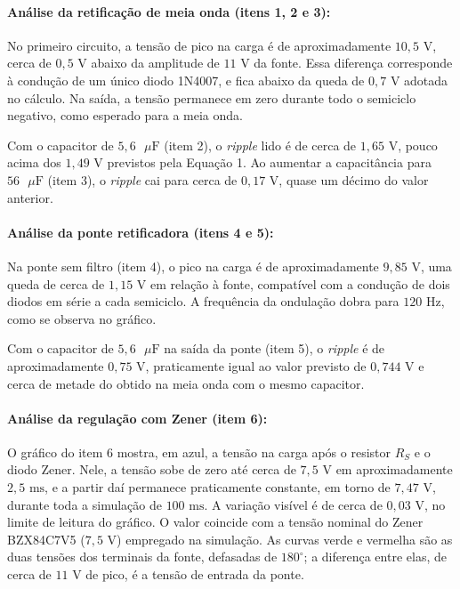 \documentclass[11pt,a4paper]{article}
\begin{document}
\paragraph{Análise da retificação de meia onda (itens 1, 2 e 3):}
No primeiro circuito, a tensão de pico na carga é de aproximadamente $10{,}5\text{ V}$, cerca de $0{,}5\text{ V}$ abaixo da amplitude de $11\text{ V}$ da fonte. Essa diferença corresponde à condução de um único diodo 1N4007, e fica abaixo da queda de $0{,}7\text{ V}$ adotada no cálculo. Na saída, a tensão permanece em zero durante todo o semiciclo negativo, como esperado para a meia onda.

Com o capacitor de $5{,}6\text{ }\mu\text{F}$ (item 2), o \textit{ripple} lido é de cerca de $1{,}65\text{ V}$, pouco acima dos $1{,}49\text{ V}$ previstos pela Equação 1. Ao aumentar a capacitância para $56\text{ }\mu\text{F}$ (item 3), o \textit{ripple} cai para cerca de $0{,}17\text{ V}$, quase um décimo do valor anterior.

\paragraph{Análise da ponte retificadora (itens 4 e 5):}
Na ponte sem filtro (item 4), o pico na carga é de aproximadamente $9{,}85\text{ V}$, uma queda de cerca de $1{,}15\text{ V}$ em relação à fonte, compatível com a condução de dois diodos em série a cada semiciclo. A frequência da ondulação dobra para $120\text{ Hz}$, como se observa no gráfico.

Com o capacitor de $5{,}6\text{ }\mu\text{F}$ na saída da ponte (item 5), o \textit{ripple} é de aproximadamente $0{,}75\text{ V}$, praticamente igual ao valor previsto de $0{,}744\text{ V}$ e cerca de metade do obtido na meia onda com o mesmo capacitor.

\paragraph{Análise da regulação com Zener (item 6):}
O gráfico do item 6 mostra, em azul, a tensão na carga após o resistor $R_S$ e o diodo Zener. Nele, a tensão sobe de zero até cerca de $7{,}5\text{ V}$ em aproximadamente $2{,}5\text{ ms}$, e a partir daí permanece praticamente constante, em torno de $7{,}47\text{ V}$, durante toda a simulação de $100\text{ ms}$. A variação visível é de cerca de $0{,}03\text{ V}$, no limite de leitura do gráfico. O valor coincide com a tensão nominal do Zener BZX84C7V5 ($7{,}5\text{ V}$) empregado na simulação. As curvas verde e vermelha são as duas tensões dos terminais da fonte, defasadas de $180^\circ$; a diferença entre elas, de cerca de $11\text{ V}$ de pico, é a tensão de entrada da ponte.
\end{document}

